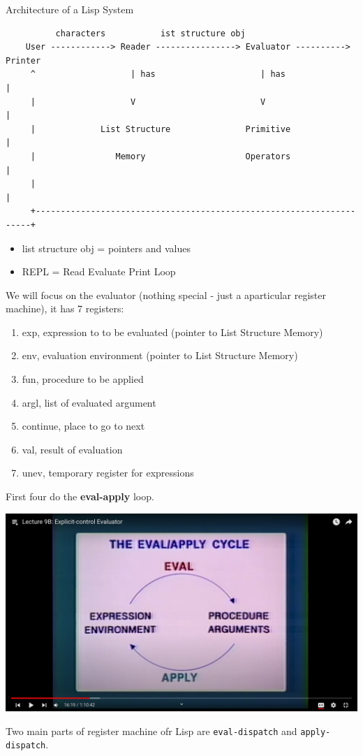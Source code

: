 \documentclass[a4paper,twoside]{article}
\numberwithin{equation}{section}
\begin{document}
Architecture of a Lisp System
\begin{lstlisting}
          characters           ist structure obj
    User ------------> Reader ----------------> Evaluator ----------> Printer
     ^                   | has                     | has                   |
     |                   V                         V                       |
     |             List Structure               Primitive                  |
     |                Memory                    Operators                  |
     |                                                                     |
     +---------------------------------------------------------------------+
\end{lstlisting}
\begin{itemize}
    \item list structure obj = pointers and values
    \item REPL = Read Evaluate Print Loop
\end{itemize}
We will focus on the evaluator (nothing special - just a aparticular register machine),
it has 7 registers:
\begin{enumerate}
    \item exp, expression to to be evaluated (pointer to List Structure Memory)
    \item env, evaluation environment (pointer to List Structure Memory)
    \item fun, procedure to be applied
    \item argl, list of evaluated argument
    \item continue, place to go to next
    \item val, result of evaluation
    \item unev, temporary register for expressions
\end{enumerate}
First four do the \textbf{eval-apply} loop.
\begin{center}
    \includegraphics[scale = 0.2]{assets/eval-apply-loop.png}
\end{center}
Two main parts of register machine ofr Lisp are \texttt{eval-dispatch} and \texttt{apply-dispatch}.
\end{document}
